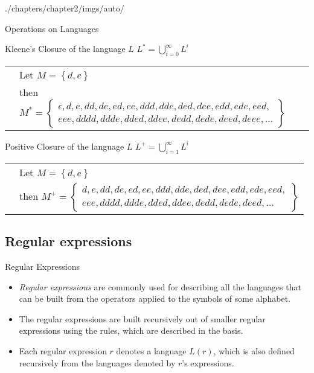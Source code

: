 \begin{graphicspathcontext}{{./chapters/chapter2/imgs/auto/}}
\begin{bibunit}[apalike]
\begin{frame}[c]{Operations on Languages}
	\begin{block}{Kleene's Closure of the language $L$}
		$L^* = \bigcup^{\infty}_{i=0}L^i$
		\begin{tabularx}{\linewidth}{@{}lX@{}}
		\insertexamplelabel & Let $M = \left\{ d, e \right\}$ \\
		& then $M^* = \left\{ \begin{array}{l}
			\scriptstyle \epsilon, d, e, dd, de, ed, ee, ddd, dde, ded, dee, edd, ede, eed, \\
			\scriptstyle eee, dddd, ddde, dded, ddee, dedd, dede, deed, deee, \dots\end{array} \right\}$
		\end{tabularx}
	\end{block}
	\begin{block}{Positive Closure of the language $L$}
		$L^+ = \bigcup^{\infty}_{i=1}L^i$
		\begin{tabularx}{\linewidth}{@{}lX@{}}
		\insertexamplelabel & Let $M = \left\{ d, e \right\}$ \\
		& then $M^+ = \left\{ \begin{array}{l}
			\scriptstyle d, e, dd, de, ed, ee, ddd, dde, ded, dee, edd, ede, eed, \\
			\scriptstyle eee, dddd, ddde, dded, ddee, dedd, dede, deed, \dots\end{array} \right\}$
		\end{tabularx}
	\end{block}
\end{frame}

\subsection{Regular expressions}

\tableofcontentslide[sections={1-5},sectionstyle={show/shaded},subsectionstyle={show/shaded/hide},subsubsectionstyle={hide/hide/hide/hide}]

\begin{frame}{Regular Expressions}
	\begin{itemize}
	\item \emph{Regular expressions} are commonly used for describing all the languages that can be built from the operators applied to the symbols of some alphabet.
	\vfill
	\item The regular expressions are built recursively out of smaller regular expressions using the rules, which are described in the basis.
	\vfill
	\item Each regular expression $r$ denotes a language $L(r)$, which is also defined recursively from the languages denoted by $r$'s expressions.
	\end{itemize}
\end{frame}


\end{bibunit}
\end{graphicspathcontext}
